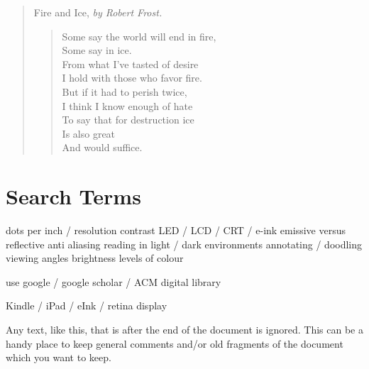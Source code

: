 \begin{quote}
Fire and Ice, \emph{by Robert Frost.}\\

\begin{verse}
Some say the world will end in fire,\\
Some say in ice.\\
From what I've tasted of desire\\
I hold with those who favor fire.\\
But if it had to perish twice,\\
I think I know enough of hate\\
To say that for destruction ice\\
Is also great\\
And would suffice.\\
\end{verse}
\end{quote}

\section{Search Terms}
\label{appendix:searchterms}

dots per inch  / resolution
contrast
LED / LCD / CRT / e-ink
emissive versus reflective
anti aliasing
reading in light / dark environments
annotating / doodling
viewing angles
brightness
levels of colour

use google / google scholar / ACM digital library



Kindle / iPad / eInk / retina display


 

Any text, like this, that is after the end of the document is ignored. This can be a
handy place to keep general comments and/or old fragments of the document
which you want to keep.

